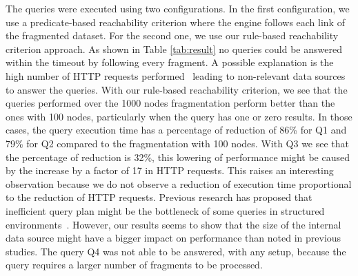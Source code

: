 The queries were executed using two configurations.
In the first configuration, we use a predicate-based reachability criterion where the engine follows each link of the fragmented dataset.
For the second one, we use our rule-based reachability criterion approach.
As shown in Table \ref{tab:result} no queries could be answered within the timeout by following every fragment.
A possible explanation is the high number of HTTP requests performed~\cite{Hartig2016} leading to non-relevant data sources to answer the queries.
With our rule-based reachability criterion, we see that the queries performed over the 1000 nodes fragmentation perform better than the ones with 100 nodes, particularly when the query has one or zero results.
In those cases, the query execution time has a percentage of reduction of 86\% for Q1 and 79\% for Q2 compared to the fragmentation with 100 nodes.
With Q3 we see that the percentage of reduction is 32\%, this lowering of performance might be caused by the increase by a factor of 17 in HTTP requests.
This raises an interesting observation because we do not observe a reduction of execution time proportional to the reduction of HTTP requests.
Previous research has proposed that inefficient query plan might be the bottleneck of some queries in structured environments~\cite{taelman2023,eschauzier_quweda_2023}.
However, our results seems to show that the size of the internal data source might have a bigger impact on performance than noted in previous studies.
The query Q4 was not able to be answered, with any setup, because the query requires a larger number of fragments to be processed.
